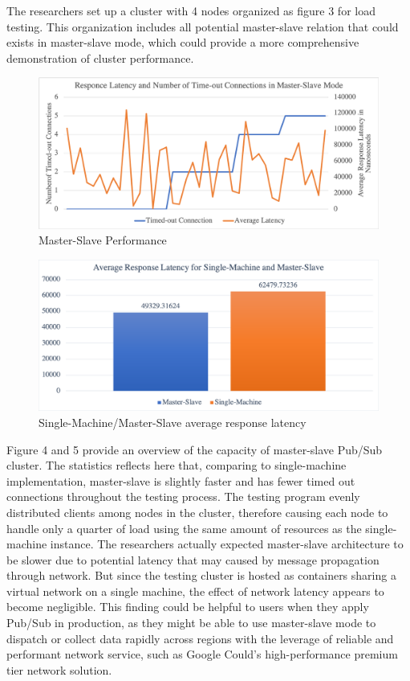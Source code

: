 The researchers set up a cluster with 4 nodes organized as figure 3 for load testing. This organization includes all potential master-slave relation that could exists in master-slave mode, which could provide a more comprehensive demonstration of cluster performance.
	
\begin{figure}[H]
	\centering
	\includegraphics[scale=0.33]{figure/master-slave/performance.png}
	\caption{Master-Slave Performance}
\end{figure}

\begin{figure}[H]
	\centering
	\includegraphics[scale=0.33]{figure/master-slave/response-latency.png}
	\caption{Single-Machine/Master-Slave average response latency}
\end{figure}

Figure 4 and 5 provide an overview of the capacity of master-slave Pub/Sub cluster. The statistics reflects here that, comparing to single-machine implementation, master-slave is slightly faster and has fewer timed out connections throughout the testing process. The testing program evenly distributed clients among nodes in the cluster, therefore causing each node  to handle only a quarter of load using the same amount of resources as the single-machine instance. The researchers actually expected master-slave architecture to be slower due to potential latency that may caused by message propagation through network. But since the testing cluster is hosted as containers sharing a virtual network on a single machine, the effect of network latency appears to become negligible. This finding could be helpful to users when they apply Pub/Sub in production, as they might be able to use master-slave mode to dispatch or collect data rapidly across regions with the leverage of reliable and performant network service, such as Google Could's high-performance premium tier network solution\citep{google-cloud-network}.

